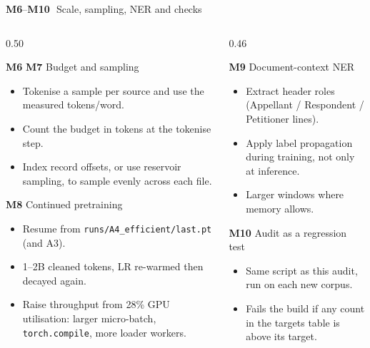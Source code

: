 \documentclass[aspectratio=169,11pt]{beamer}
\newcommand{\code}[1]{\texttt{\small #1}}
\newcommand{\mt}[1]{\textbf{\textcolor{aqua!80!black}{#1}}} %
\begin{document}
\begin{frame}{\mt{M6}--\mt{M10}\,\, Scale, sampling, NER and checks}
  \begin{columns}[T]
    \begin{column}{0.50\textwidth}
      \scriptsize
      \begin{block}{\mt{M6} \mt{M7} Budget and sampling}
        \begin{itemize}
          \item Tokenise a sample per source and use the measured tokens/word.
          \item Count the budget in tokens at the tokenise step.
          \item Index record offsets, or use reservoir sampling, to sample evenly across each file.
        \end{itemize}
      \end{block}
      \begin{block}{\mt{M8} Continued pretraining}
        \begin{itemize}
          \item Resume from \code{runs/A4\_efficient/last.pt} (and A3).
          \item 1--2B cleaned tokens, LR re-warmed then decayed again.
          \item Raise throughput from 28\% GPU utilisation: larger micro-batch, \code{torch.compile}, more loader workers.
        \end{itemize}
      \end{block}
    \end{column}
    \begin{column}{0.46\textwidth}
      \scriptsize
      \begin{block}{\mt{M9} Document-context NER}
        \begin{itemize}
          \item Extract header roles (Appellant / Respondent / Petitioner lines).
          \item Apply label propagation during training, not only at inference.
          \item Larger windows where memory allows.
        \end{itemize}
      \end{block}
      \begin{block}{\mt{M10} Audit as a regression test}
        \begin{itemize}
          \item Same script as this audit, run on each new corpus.
          \item Fails the build if any count in the targets table is above its target.
        \end{itemize}
      \end{block}
    \end{column}
  \end{columns}
\end{frame}
\end{document}
